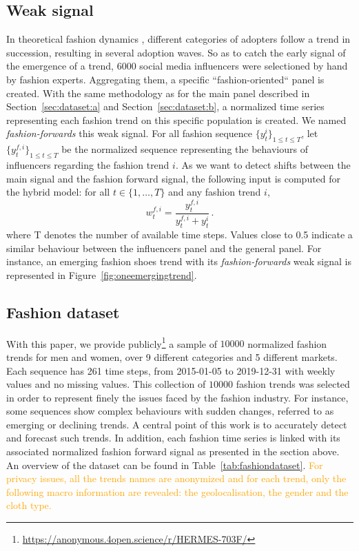 \documentclass[10pt]{article} %
\newcommand{\ts}{y}
\newcommand{\ws}{w}
\newcommand{\numberts}{10000}
\begin{document}
\subsection{Weak signal}

In theoretical fashion dynamics \citep{rogers1962}, different categories of adopters follow a trend in succession, resulting in several adoption waves.
So as to catch the early signal of the emergence of a trend, 6000 social media influencers were selectioned by hand by fashion experts. Aggregating them, a specific ``fashion-oriented`` panel is created. With the same methodology as for the main panel described in Section~\ref{sec:dataset:a} and Section~\ref{sec:dataset:b}, a normalized time series representing each fashion trend on this specific population is created. We named \textit{fashion-forwards} this weak signal.  For all fashion sequence $\{y^i_t\}_{1 \leq t \leq T}$, let $\{\ts^{f,i}_t\}_{1 \leq t \leq T}$ be the normalized sequence representing the behaviours of influencers regarding the fashion trend $i$. As we want to detect shifts between the main signal and the fashion forward signal, the following input is computed for the hybrid model: for all $t \in \{1,\ldots,T\}$ and any fashion trend $i$,
$$
\ws^{f,i}_{t} = \frac{\ts_t^{f,i}}{\ts_t^{f,i}+\ts_t^{i}}\,.
$$
where T denotes the number of available time steps. Values close to 0.5 indicate a similar behaviour between the influencers panel and the general panel. For instance, an  emerging fashion shoes trend with its \textit{fashion-forwards} weak signal is represented in Figure~\ref{fig:oneemergingtrend}. 

\subsection{Fashion dataset}

With this paper, we provide publicly\footnote[1]{\url{https://anonymous.4open.science/r/HERMES-703F/}} a sample of $\numberts$ normalized fashion trends for men and women, over 9 different categories and 5 different markets. Each sequence has 261 time steps, from 2015-01-05 to 2019-12-31 with weekly values and no missing values. This collection of $\numberts$ fashion trends was selected in order to represent finely the issues faced by the fashion industry. For instance, some sequences show complex behaviours with sudden changes, referred to as emerging or declining trends. A central point of this work is to accurately detect and forecast such trends. In addition, each fashion time series is linked with its associated normalized fashion forward signal as presented in the section above. An overview of the dataset can be found in Table~\ref{tab:fashiondataset}. \textcolor{orange}{For privacy issues, all the trends names are anonymized and for each trend, only the following macro information are revealed: the geolocalisation, the gender and the cloth type.}
\end{document}

